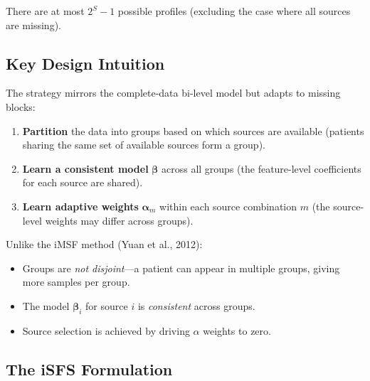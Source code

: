 \documentclass[11pt,a4paper]{article}
\begin{document}
There are at most $2^S - 1$ possible profiles (excluding the case where all sources are missing).

\subsection{Key Design Intuition}

The strategy mirrors the complete-data bi-level model but adapts to missing blocks:
\begin{enumerate}
    \item \textbf{Partition} the data into groups based on which sources are available (patients sharing the same set of available sources form a group).
    \item \textbf{Learn a consistent model} $\boldsymbol{\beta}$ across all groups (the feature-level coefficients for each source are shared).
    \item \textbf{Learn adaptive weights} $\boldsymbol{\alpha}_m$ within each source combination $m$ (the source-level weights may differ across groups).
\end{enumerate}

Unlike the iMSF method (Yuan et al., 2012):
\begin{itemize}
    \item Groups are \emph{not disjoint}---a patient can appear in multiple groups, giving more samples per group.
    \item The model $\boldsymbol{\beta}_i$ for source $i$ is \emph{consistent} across groups.
    \item Source selection is achieved by driving $\alpha$ weights to zero.
\end{itemize}

\subsection{The iSFS Formulation}
\end{document}
